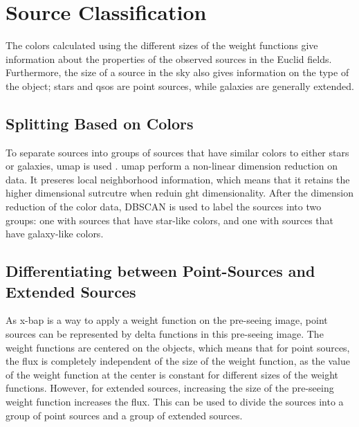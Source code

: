 \newpage
\section{Source Classification}

The colors calculated using the different sizes of the weight functions give information about the properties of the observed sources in the Euclid fields. Furthermore, the size of a source in the sky also gives information on the type of the object; stars and \glspl{qso} are point sources, while galaxies are generally extended.


\subsection{Splitting Based on Colors}\label{subsec: splitting based on colors}
To separate sources into groups of sources that have similar colors to either stars or galaxies, \gls{umap} is used \citep{mcinnes_umap_2018}. \gls{umap} perform a non-linear dimension reduction on data. It preseres local neighborhood information, which means that it retains the higher dimensional sutrcutre when reduin ght dimensionality. After the dimension reduction of the color data, DBSCAN \citep{ester_density-based_1996} is used to label the sources into two groups: one with sources that have star-like colors, and one with sources that have galaxy-like colors.

\subsection{Differentiating between Point-Sources and Extended Sources}

As \gls{x-bap} is a way to apply a weight function on the pre-seeing image, point sources can be represented by delta functions in this pre-seeing image. The weight functions are centered on the objects, which means that for point sources, the flux is completely independent of the size of the weight function, as the value of the weight function at the center is constant for different sizes of the weight functions. However, for extended sources, increasing the size of the pre-seeing weight function increases the flux. This can be used to divide the sources into a group of point sources and a group of extended sources.

